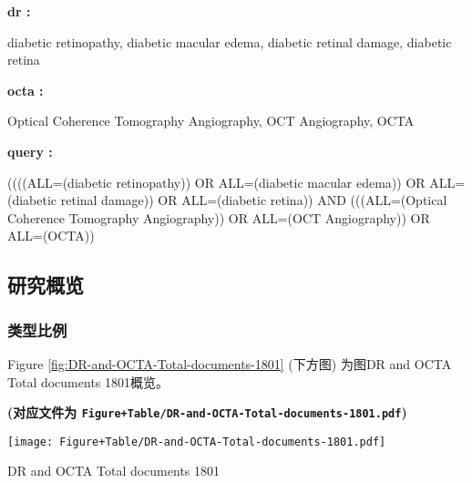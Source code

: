 \documentclass[
]{article}
\begin{document}
\begin{center}\begin{tcolorbox}[colback=gray!10, colframe=gray!50, width=0.9\linewidth, arc=1mm, boxrule=0.5pt]
\textbf{
dr
:}

\vspace{0.5em}

    diabetic retinopathy, diabetic macular edema, diabetic
retinal damage, diabetic retina

\vspace{2em}


\textbf{
octa
:}

\vspace{0.5em}

    Optical Coherence Tomography Angiography, OCT
Angiography, OCTA

\vspace{2em}


\textbf{
query
:}

\vspace{0.5em}

    ((((ALL=(diabetic retinopathy)) OR ALL=(diabetic
macular edema)) OR ALL=(diabetic retinal damage)) OR
ALL=(diabetic retina)) AND (((ALL=(Optical Coherence
Tomography Angiography)) OR ALL=(OCT Angiography)) OR
ALL=(OCTA))

\vspace{2em}
\end{tcolorbox}
\end{center}

\hypertarget{overview}{%
\subsection{研究概览}\label{overview}}

\hypertarget{ux7c7bux578bux6bd4ux4f8b}{%
\subsubsection{类型比例}\label{ux7c7bux578bux6bd4ux4f8b}}

Figure \ref{fig:DR-and-OCTA-Total-documents-1801} (下方图) 为图DR and OCTA Total documents 1801概览。

\textbf{(对应文件为 \texttt{Figure+Table/DR-and-OCTA-Total-documents-1801.pdf})}

\def\@captype{figure}
\begin{center}
\texttt{[image: Figure+Table/DR-and-OCTA-Total-documents-1801.pdf]}
\caption{DR and OCTA Total documents 1801}\label{fig:DR-and-OCTA-Total-documents-1801}
\end{center}
\end{document}

